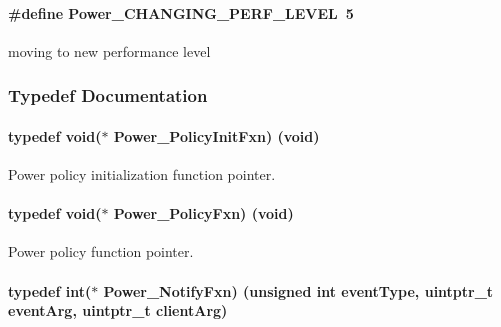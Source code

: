 \paragraph[{Power\+\_\+\+C\+H\+A\+N\+G\+I\+N\+G\+\_\+\+P\+E\+R\+F\+\_\+\+L\+E\+V\+E\+L}]{\setlength{\rightskip}{0pt plus 5cm}\#define Power\+\_\+\+C\+H\+A\+N\+G\+I\+N\+G\+\_\+\+P\+E\+R\+F\+\_\+\+L\+E\+V\+E\+L~5}\label{_power_8h_a2b7d4ba49a9418af10c84132a8cbf108}
moving to new performance level 

\subsubsection{Typedef Documentation}
\paragraph[{Power\+\_\+\+Policy\+Init\+Fxn}]{\setlength{\rightskip}{0pt plus 5cm}typedef void($\ast$ Power\+\_\+\+Policy\+Init\+Fxn) (void)}\label{_power_8h_a435fdeb71d13ea6be86f599c9b6a0d78}


Power policy initialization function pointer. 

\paragraph[{Power\+\_\+\+Policy\+Fxn}]{\setlength{\rightskip}{0pt plus 5cm}typedef void($\ast$ Power\+\_\+\+Policy\+Fxn) (void)}\label{_power_8h_a333038d1e9cd5f93dda7b83f8a1afa8b}


Power policy function pointer. 

\paragraph[{Power\+\_\+\+Notify\+Fxn}]{\setlength{\rightskip}{0pt plus 5cm}typedef int($\ast$ Power\+\_\+\+Notify\+Fxn) (unsigned int event\+Type, uintptr\+\_\+t event\+Arg, uintptr\+\_\+t client\+Arg)}\label{_power_8h_a91335240b2081eeefec80d043030c857}



